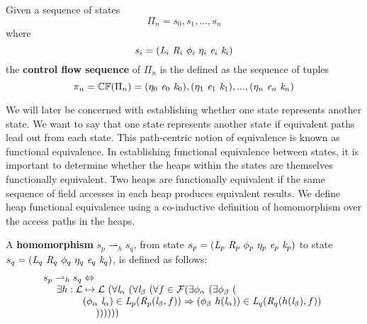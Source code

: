 \begin{definition}
Given a sequence of states $$\Pi_n = s_0,s_1,...,s_n$$ where $$s_i = (\cfgnt{L}_i\ \cfgnt{R}_i\ \phi_i\ \eta_i\ \cfgnt{e}_i\ \cfgnt{k}_i )$$ the \textbf{control flow sequence} of $\Pi_n$ is the defined as the sequence of tuples $$ \pi_n = \mathbb{CF}(\Pi_n) = (\eta_0\ \cfgnt{e}_0\ \cfgnt{k}_0),(\eta_1\ \cfgnt{e}_1\ \cfgnt{k}_1),...,(\eta_n\ \cfgnt{e}_n\ \cfgnt{k}_n)$$
\end{definition}


We will later be concerned with establishing whether one state
represents another state. We want to say that one state represents
another state if equivalent paths lead out from each state. This
path-centric notion of equivalence is known as functional
equivalence. In establishing functional equivalence between states, it
is important to determine whether the heaps within the states are
themselves functionally equivalent. Two heaps are functionally
equivalent if the same sequence of field accesses in each heap
produces equivalent results. We define heap functional equivalence
using a co-inductive definition of homomorphism over the access paths
in the heaps.

\begin{definition}
\label{def:homomorphism}
A \textbf{homomorphism} $s_p \rightharpoonup_{h} s_q$, from state $s_p = ( \cfgnt{L}_p\ \cfgnt{R}_p\ \phi_p\ \eta_p\ \cfgnt{e}_p\ \cfgnt{k}_p )$ to state $s_q = ( \cfgnt{L}_q\ \cfgnt{R}_q\ \phi_q\ \eta_q\ \cfgnt{e}_q\ \cfgnt{k}_q )$, is defined as follows: 
$$
\begin{array}{l}
 s_p \rightharpoonup_{h} s_q \Leftrightarrow \\
\ \ \ \ \exists h: \mathcal{L} \mapsto \mathcal{L}\ (\forall \cfgnt{l}_\alpha\ (\forall \cfgnt{l}_\beta\ (\forall f \in \mathcal{F}( \exists \phi_\alpha\ (\exists \phi_\beta\ ( \\ 
\ \ \ \ \ \ \ \ \ \ \ \ (\phi_\alpha\ \cfgnt{l}_\alpha) \in \cfgnt{L}_p(\cfgnt{R}_p (\cfgnt{l}_\beta,f )) \Rightarrow (\phi_\beta\ h(\cfgnt{l}_\alpha))\in \cfgnt{L}_q(\cfgnt{R}_q (h(\cfgnt{l}_\beta),f ))\ \\
\ \ \ \ \ \ \ \ \ \ \ \ \ \ \ \  )) ) ) ) )
\end{array}
$$
\begin{comment}
$$
\begin{array}{l}
s_p \rightharpoonup_{h} s_q \Leftrightarrow \\
\ \ \ \ \exists h: \mathcal{L} \mapsto \mathcal{L}\ (\forall \cfgnt{l}_\beta\ (\forall f \in \mathit{fields}(\mathrm{type}(\cfgnt{l}_\beta))\ ( \\
\ \ \ \ \ \ \ \ \ \ \ \ \forall (\phi_\alpha\ \cfgnt{l}_\alpha) \in \cfgnt{L}_p(\cfgnt{R}_p (\cfgnt{l}_\beta,f ))\ ( \\
\ \ \ \ \ \ \ \ \ \ \ \ \ \ \ \ \exists \phi_\beta\ ((\phi_\beta\ h(\cfgnt{l}_\alpha))\in \cfgnt{L}_q(\cfgnt{R}_q (h(\cfgnt{l}_\beta),f )))))))\\
\end{array}
$$
\end{comment}
\end{definition}

